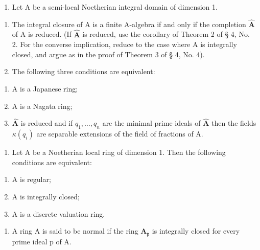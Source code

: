 
\begin{enumerate}
\def\labelenumi{\arabic{enumi})}
\tightlist
\item
  Let A be a semi-local Noetherian integral domain of dimension 1.
\end{enumerate}

\begin{enumerate}
\def\labelenumi{\alph{enumi})}
\item
  The integral closure of A is a finite A-algebra if and only if the completion \(\hat{\mathbf{A}}\) of A is reduced. (If \(\hat{\mathbf{A}}\) is reduced, use the corollary of Theorem 2 of § 4, No. 2. For the converse implication, reduce to the case where A is integrally closed, and argue as in the proof of Theorem 3 of § 4, No. 4).
\item
  The following three conditions are equivalent:
\end{enumerate}

\begin{enumerate}
\def\labelenumi{(\roman{enumi})}
\item
  A is a Japanese ring;
\item
  A is a Nagata ring;
\item
  \(\hat{\mathbf{A}}\) is reduced and if \(q_{1},\ldots,q_{n}\) are the minimal prime ideals of \(\hat{\mathbf{A}}\) then the fields \(\kappa(q_{i})\) are separable extensions of the field of fractions of A.
\end{enumerate}

\begin{enumerate}
\def\labelenumi{\arabic{enumi})}
\setcounter{enumi}{1}
\tightlist
\item
  Let A be a Noetherian local ring of dimension 1. Then the following conditions are equivalent:
\end{enumerate}

\begin{enumerate}
\def\labelenumi{\alph{enumi})}
\item
  A is regular;
\item
  A is integrally closed;
\item
  A is a discrete valuation ring.
\end{enumerate}

\begin{enumerate}
\def\labelenumi{\arabic{enumi})}
\setcounter{enumi}{2}
\tightlist
\item
  A ring A is said to be normal if the ring \(\mathbf{A}_{\mathfrak{p}}\) is integrally closed for every prime ideal p of A.
\end{enumerate}

